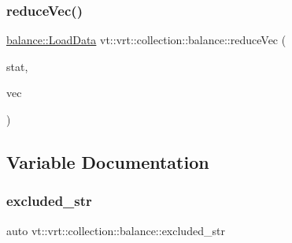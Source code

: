 \mbox{\label{namespacevt_1_1vrt_1_1collection_1_1balance_a4b385056c706c7325c54963e7d9a1b32}} 
\subsubsection{\texorpdfstring{reduce\+Vec()}{reduceVec()}}
{\footnotesize\ttfamily \hyperlink{structvt_1_1vrt_1_1collection_1_1balance_1_1_load_data}{balance\+::\+Load\+Data} vt\+::vrt\+::collection\+::balance\+::reduce\+Vec (\begin{DoxyParamCaption}\item[{\hyperlink{namespacevt_1_1vrt_1_1collection_1_1lb_af0e20ef9afee77295053aa83bf1348b1}{lb\+::\+Statistic}}]{stat,  }\item[{std\+::vector$<$ \hyperlink{structvt_1_1vrt_1_1collection_1_1balance_1_1_load_data}{balance\+::\+Load\+Data} $>$ \&\&}]{vec }\end{DoxyParamCaption})}



\subsection{Variable Documentation}
\mbox{\label{namespacevt_1_1vrt_1_1collection_1_1balance_af2f6674ecc7191ddbfe31e87569fe334}} 
\subsubsection{\texorpdfstring{excluded\+\_\+str}{excluded\_str}}
{\footnotesize\ttfamily auto vt\+::vrt\+::collection\+::balance\+::excluded\+\_\+str}


